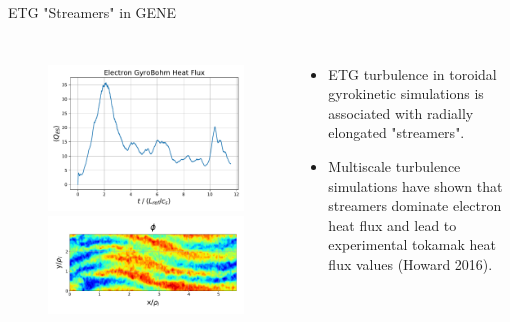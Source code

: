 \documentclass[aspectratio=43]{beamer}
\begin{document}
   \begin{frame}{ETG "Streamers" in GENE}
      \begin{columns}
         \begin{figure}
            \hspace*{-.3cm}\includegraphics[scale=.3]{Images/etgHeatFlux.pdf}
            \\
            \hspace*{-.3cm}\includegraphics[scale=.2]{Images/genePhiETG_sat2.pdf}
         \end{figure}
         \begin{itemize}
            \item ETG turbulence in toroidal gyrokinetic simulations is associated with radially elongated "streamers".
            \vspace{5mm}
            \item Multiscale turbulence simulations have shown that streamers dominate electron heat flux and lead
            to experimental tokamak heat flux values (Howard 2016).
         \end{itemize}
      \end{columns}
   \end{frame}
\end{document}
